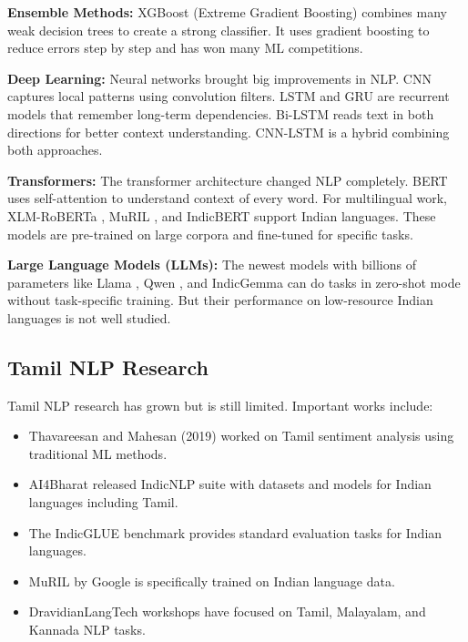 \documentclass[conference]{IEEEtran}
\begin{document}
\textbf{Ensemble Methods:} XGBoost (Extreme Gradient Boosting) \cite{chen2016xgboost} combines many weak decision trees to create a strong classifier. It uses gradient boosting to reduce errors step by step and has won many ML competitions.

\textbf{Deep Learning:} Neural networks brought big improvements in NLP. CNN \cite{kim2014} captures local patterns using convolution filters. LSTM \cite{hochreiter1997} and GRU \cite{cho2014} are recurrent models that remember long-term dependencies. Bi-LSTM reads text in both directions for better context understanding. CNN-LSTM is a hybrid combining both approaches.

\textbf{Transformers:} The transformer architecture \cite{vaswani2017} changed NLP completely. BERT \cite{devlin2019} uses self-attention to understand context of every word. For multilingual work, XLM-RoBERTa \cite{conneau2020}, MuRIL \cite{khanuja2021}, and IndicBERT \cite{kakwani2020} support Indian languages. These models are pre-trained on large corpora and fine-tuned for specific tasks.

\textbf{Large Language Models (LLMs):} The newest models with billions of parameters like Llama \cite{touvron2023}, Qwen \cite{bai2023}, and IndicGemma can do tasks in zero-shot mode without task-specific training. But their performance on low-resource Indian languages is not well studied.

\subsection{Tamil NLP Research}

Tamil NLP research has grown but is still limited. Important works include:
\begin{itemize}
\item Thavareesan and Mahesan (2019) \cite{thavareesan2019} worked on Tamil sentiment analysis using traditional ML methods.
\item AI4Bharat \cite{kakwani2020} released IndicNLP suite with datasets and models for Indian languages including Tamil.
\item The IndicGLUE benchmark provides standard evaluation tasks for Indian languages.
\item MuRIL \cite{khanuja2021} by Google is specifically trained on Indian language data.
\item DravidianLangTech workshops \cite{priyadharshini2021} have focused on Tamil, Malayalam, and Kannada NLP tasks.
\end{itemize}
\end{document}

